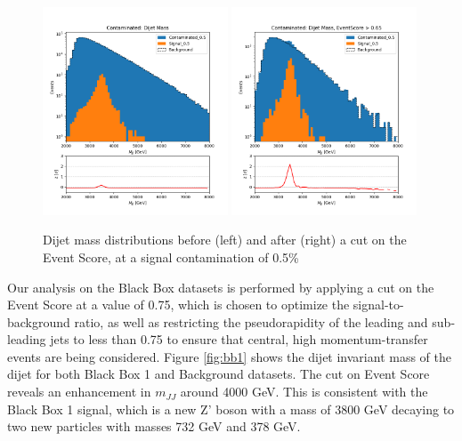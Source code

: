 \documentclass[letterpaper,11pt]{article}
\begin{document}
\begin{figure}[h!]
	\begin{center}
		\includegraphics[width=0.49\textwidth]{imgs/2Prong_Contaminated_0p5_JJ_Mass_Multi.png}
		\includegraphics[width=0.49\textwidth]{imgs/2Prong_Contaminated_0p5_JJ_Mass_EventScore0p65_Multi.png}
	\end{center}
	\caption{Dijet mass distributions before (left) and after (right) a cut on the Event Score, at a signal contamination of 0.5\%}
	\label{fig:m_JJ}
\end{figure}

Our analysis on the Black Box datasets is performed by applying a cut on the Event Score at a value of 0.75, which is chosen to optimize the signal-to-background ratio, as well as restricting the pseudorapidity of the leading and sub-leading jets to less than 0.75 to ensure that central, high momentum-transfer events are being considered. Figure {\ref{fig:bb1}} shows the dijet invariant mass of the dijet for both Black Box 1 and Background datasets. The cut on Event Score reveals an enhancement in $m_{JJ}$ around 4000 GeV. This is consistent with the Black Box 1 signal, which is a new Z' boson with a mass of 3800 GeV decaying to two new particles with masses 732 GeV and 378 GeV.
\end{document}
